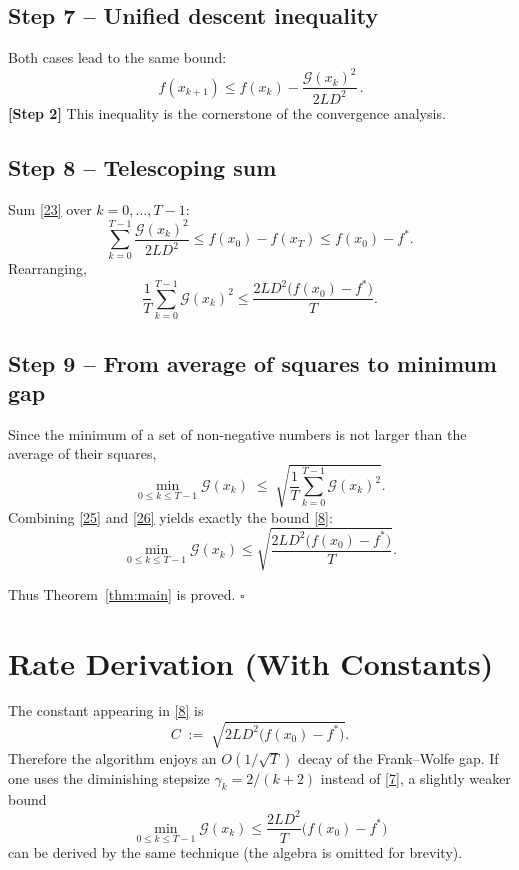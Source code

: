 \documentclass[11pt]{article}
\begin{document}
\subsection*{Step 7 – Unified descent inequality}
Both cases lead to the same bound:
\[
\boxed{\,f(x_{k+1}) \le f(x_{k}) - \frac{\mathcal G(x_{k})^{2}}{2 L D^{2}}\,}.
\tag{23}
\]
\textbf{[Step 2]} This inequality is the cornerstone of the convergence
analysis.

\subsection*{Step 8 – Telescoping sum}
Sum \eqref{23} over $k=0,\dots,T-1$:
\[
\sum_{k=0}^{T-1}\frac{\mathcal G(x_{k})^{2}}{2 L D^{2}}
   \le f(x_{0}) - f(x_{T})
   \le f(x_{0}) - f^{*}.
\tag{24}
\]
Rearranging,
\[
\frac{1}{T}\sum_{k=0}^{T-1}\mathcal G(x_{k})^{2}
   \le \frac{2 L D^{2}\bigl(f(x_{0})-f^{*}\bigr)}{T}.
\tag{25}
\]

\subsection*{Step 9 – From average of squares to minimum gap}
Since the minimum of a set of non‑negative numbers is not larger than the
average of their squares,
\[
\min_{0\le k\le T-1}\mathcal G(x_{k})
   \;\le\;
\sqrt{\frac{1}{T}\sum_{k=0}^{T-1}\mathcal G(x_{k})^{2}}.
\tag{26}
\]
Combining \eqref{25} and \eqref{26} yields exactly the bound \eqref{8}:
\[
\min_{0\le k\le T-1}\mathcal G(x_{k})
   \le
\sqrt{\frac{2 L D^{2}\bigl(f(x_{0})-f^{*}\bigr)}{T}} .
\tag{27}
\]

Thus Theorem~\ref{thm:main} is proved.  $\square$

\section{Rate Derivation (With Constants)}
\label{sec:rate}
The constant appearing in \eqref{8} is
\[
C \;:=\; \sqrt{2 L D^{2}\bigl(f(x_{0})-f^{*}\bigr)} .
\]
Therefore the algorithm enjoys an $O(1/\sqrt{T})$ decay of the Frank–Wolfe
gap.  If one uses the diminishing stepsize $\gamma_{k}=2/(k+2)$ instead of
\eqref{7}, a slightly weaker bound
\[
\min_{0\le k\le T-1}\mathcal G(x_{k}) \le
\frac{2 L D^{2}}{T}
\bigl(f(x_{0})-f^{*}\bigr)
\tag{28}
\]
can be derived by the same technique (the algebra is omitted for brevity).

\end{document}
